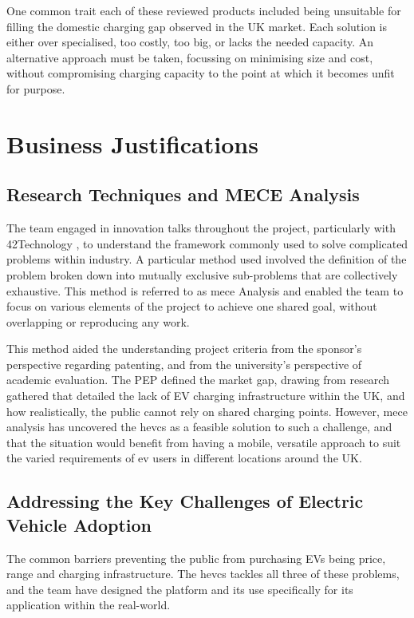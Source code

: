 \documentclass [12pt]{article}
\begin{document}
One common trait each of these reviewed products included being unsuitable for filling the domestic charging gap observed in the UK market. Each solution is either over specialised, too costly, too big, or lacks the needed capacity. An alternative approach must be taken, focussing on minimising size and cost, without compromising charging capacity to the point at which it becomes unfit for purpose.

\newpage
\section{Business Justifications}

\subsection{Research Techniques and MECE Analysis}

The team engaged in innovation talks throughout the project, particularly with 42Technology \cite{42T}, to understand the framework commonly used to solve complicated problems within industry. A particular method used involved the definition of the problem broken down into mutually exclusive sub-problems that are collectively exhaustive. This method is referred to as \gls{mece} Analysis and enabled the team to focus on various elements of the project to achieve one shared goal, without overlapping or reproducing any work.

This method aided the understanding project criteria from the sponsor’s perspective regarding patenting, and from the university’s perspective of academic evaluation. The PEP defined the market gap, drawing from research gathered that detailed the lack of EV charging infrastructure within the UK, and how realistically, the public cannot rely on shared charging points. However, \gls{mece} analysis has uncovered the \gls{hevcs} as a feasible solution to such a challenge, and that the situation would benefit from having a mobile, versatile approach to suit the varied requirements of \gls{ev} users in different locations around the UK.

\subsection{Addressing the Key Challenges of Electric Vehicle Adoption}

The common barriers preventing the public from purchasing EVs being price, range and charging infrastructure. The \gls{hevcs} tackles all three of these problems, and the team have designed the platform and its use specifically for its application within the real-world.
\end{document}
